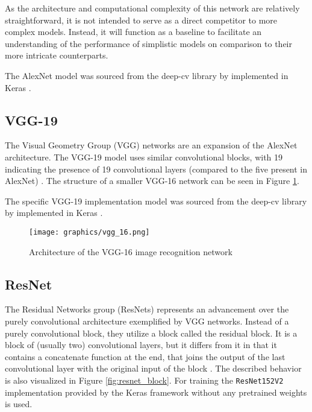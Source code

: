 \documentclass[draft,final]{vutinfth} %
\begin{document}
As the architecture and computational complexity of this network are relatively straightforward, it is not intended to serve as a direct competitor to more complex models. Instead, it will function as a baseline to facilitate an understanding of the performance of simplistic models on comparison to their more intricate counterparts.

The AlexNet model was sourced from the deep-cv library by \citeauthor{krizhevsky_imagenet_2012} implemented in Keras \cite{chollet_keras_2015}.

\subsection{VGG-19}
The Visual Geometry Group (VGG) networks are an expansion of the AlexNet architecture. The VGG-19 model uses similar convolutional blocks, with 19 indicating the presence of 19 convolutional layers (compared to the five present in AlexNet) \cite{simonyan_very_2015}. The structure of a smaller VGG-16 network can be seen in Figure \ref{fig:vgg16}.

The specific VGG-19 implementation model was sourced from the deep-cv library by \citeauthor{krizhevsky_imagenet_2012} implemented in Keras \cite{chollet_keras_2015}.

\begin{figure}
    \centering
    \texttt{[image: graphics/vgg\_16.png]}
    \caption{Architecture of the VGG-16 image recognition network \cite{simonyan_very_2015, bangar_vgg-net_2022}}
    \label{fig:vgg16}
\end{figure}

\subsection{ResNet} \label{sec:meth_resnet}
The Residual Networks group (ResNets) represents an advancement over the purely convolutional architecture exemplified by VGG networks. Instead of a purely convolutional block, they utilize a block called the residual block. It is a block of (usually two) convolutional layers, but it differs from it in that it contains a concatenate function at the end, that joins the output of the last convolutional layer with the original input of the block \citeauthor{he_deep_2015}. The described behavior is also visualized in Figure \ref{fig:resnet_block}.
For training the \verb|ResNet152V2| implementation provided by the Keras framework \cite{chollet_keras_2015} without any pretrained weights is used.
\end{document}
